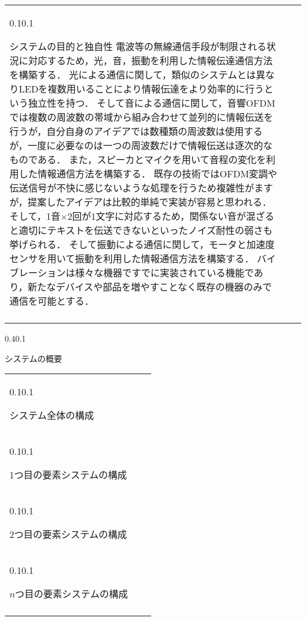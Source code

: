 \documentclass[a4j,11pt,dvipdfmx]{jsarticle}
\makeatletter
\renewcommand{\section}{%
    \@startsection{section}{1}{\z@}%
    {0.4\Cvs}{0.1\Cvs}%
    {\normalfont\headfont\raggedright}}
\renewcommand{\subsection}{%
    \@startsection{subsection}{1}{\z@}%
    {0.1\Cvs}{0.1\Cvs}%
    {\normalfont\headfont\raggedright}}
\newcommand{\bhline}{\noalign{\hrule height 1pt}}
\makeatother
\begin{document}
\begin{table}[H]
\begin{tabular}{bp{}b}
\subsection{システムの目的と独自性}
電波等の無線通信手段が制限される状況に対応するため，光，音，振動を利用した情報伝達通信方法を構築する．
光による通信に関して，類似のシステムとは異なりLEDを複数用いることにより情報伝達をより効率的に行うという独立性を持つ．	
そして音による通信に関して，音響OFDMでは複数の周波数の帯域から組み合わせて並列的に情報伝送を行うが，自分自身のアイデアでは数種類の周波数は使用するが，一度に必要なのは一つの周波数だけで情報伝送は逐次的なものである．
また，スピーカとマイクを用いて音程の変化を利用した情報通信方法を構築する．
既存の技術ではOFDM変調や伝送信号が不快に感じないような処理を行うため複雑性がますが，提案したアイデアは比較的単純で実装が容易と思われる．
そして，1音$\times$2回が1文字に対応するため，関係ない音が混ざると適切にテキストを伝送できないといったノイズ耐性の弱さも挙げられる．
そして振動による通信に関して，モータと加速度センサを用いて振動を利用した情報通信方法を構築する．
バイブレーションは様々な機器ですでに実装されている機能であり，新たなデバイスや部品を増やすことなく既存の機器のみで通信を可能とする．
	\\ \bhline
\end{tabular}
\end{table}

\section{システムの概要}\label{sec:about_system}
\begin{table}[H]
\vspace{-1em}
\centering
\begin{tabular}{bp{}b}
\bhline
\subsection{システム全体の構成}
	
	\\ \bhline
\subsection{1つ目の要素システムの構成}
	
	 \\ \bhline
\subsection{2つ目の要素システムの構成}
	
	 \\ \bhline
\subsection{$n$つ目の要素システムの構成}
	
	 \\ \bhline
\end{tabular}
\end{table}
\end{document}
